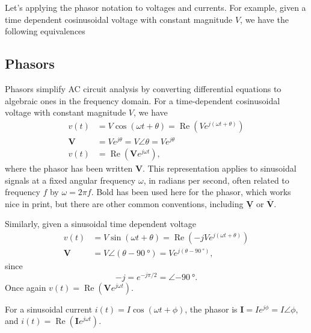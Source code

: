 \documentclass[letterpaper]{scrartcl}
\newcommand{\lr}[1]{\left(#1\right)}
\DeclareMathOperator{\Real}{Re}
\newcommand{\phasor}[1]{\mathbf{#1}}
\begin{document}
Let's applying the phasor notation to voltages and currents.  For example, given a time dependent cosinusoidal voltage with constant magnitude \( V \), we have the following equivalences

\subsection*{Phasors}
Phasors simplify AC circuit analysis by converting differential equations to algebraic ones in the frequency domain. For a time-dependent cosinusoidal voltage with constant magnitude \( V \), we have
\begin{equation}\label{eqn:karlCircuitsCheatSheet:260}
\begin{aligned}
v(t)       &= V \cos\lr{ \omega t + \theta } = \Real \lr{ V e^{j \lr{\omega t + \theta} } } \\
\phasor{V} &= V e^{j \theta} = V \angle \theta = V e^{j \theta} \\
v(t)       &= \Real \lr{ \phasor{V} e^{j \omega t} },
\end{aligned}
\end{equation}
where the phasor has been written \( \phasor{V} \).  This representation applies to
sinusoidal signals at a fixed angular frequency \( \omega \), in radians per second, often related to frequency \(f\) by \( \omega = 2 \pi f \).
Bold has been used here for the phasor, which works nice in print, but there are other common conventions, including \(\underline{\phasor{V}}\) or \(\overline{\phasor{V}}\).

Similarly, given a sinusoidal time dependent voltage
\begin{equation}\label{eqn:karlCircuitsCheatSheet:320}
\begin{aligned}
v(t)       &= V \sin\lr{ \omega t + \theta }            = \Real \lr{ -j V e^{j\lr{ \omega t + \theta } } } \\
\phasor{V} &= V \angle \lr{ \theta - \SI{90}{\degree}}  = V e^{j \lr{ \theta - \SI{90}{\degree}} },
\end{aligned}
\end{equation}
since
\begin{equation}\label{eqn:karlCircuitsCheatSheet:400}
-j = e^{-j \pi/2} = \angle \SI{-90}{\degree}.
\end{equation}
Once again \( v(t) = \Real \lr{ \phasor{V} e^{j \omega t} } \).

For a sinusoidal current \( i(t) = I \cos(\omega t + \phi) \), the phasor is \( \phasor{I} = I e^{j \phi} = I \angle \phi \), and \( i(t) = \Real \lr{ \phasor{I} e^{j \omega t} } \).
\end{document}
